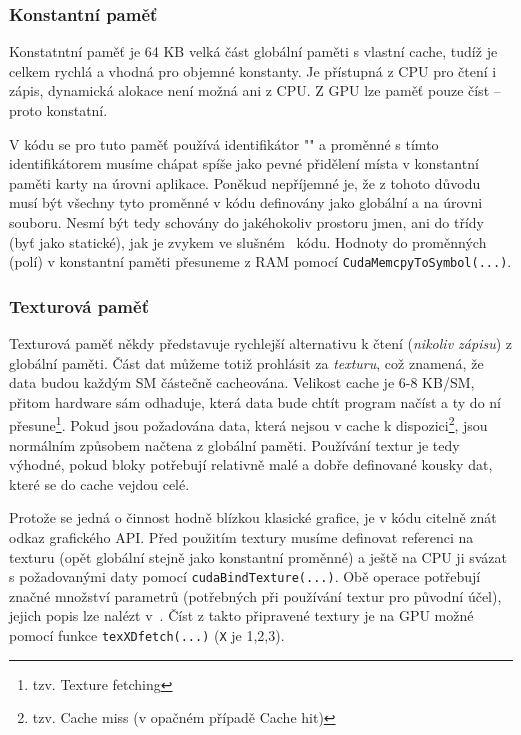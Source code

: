     \subsubsection{Konstantní paměť}

    Konstatntní paměť je 64 KB velká část globální paměti s vlastní cache, tudíž je celkem rychlá a vhodná pro objemné konstanty. Je přístupná z CPU pro čtení i zápis, dynamická alokace není možná ani z CPU. Z GPU lze paměť pouze číst -- proto konstatní.

    V kódu se pro tuto paměť používá identifikátor \Vr"" a proměnné s tímto identifikátorem musíme chápat spíše jako pevné přidělení místa v konstantní paměti karty na úrovni aplikace. Poněkud nepříjemné je, že z tohoto důvodu musí být všechny tyto proměnné v kódu definovány jako globální a na úrovni souboru. Nesmí být tedy schovány do jakéhokoliv prostoru jmen, ani do třídy (byť jako statické), jak je zvykem ve slušném \Cpp ~kódu. Hodnoty do proměnných (polí) v konstantní paměti přesuneme z RAM pomocí {\tt CudaMemcpyToSymbol(...)}.

    \subsubsection{Texturová paměť}

    Texturová paměť někdy představuje rychlejší alternativu k čtení (\emph{nikoliv zápisu}) z globální paměti. Část dat můžeme totiž prohlásit za \emph{texturu}, což znamená, že data budou každým SM částečně cacheována. Velikost cache je 6-8 KB/SM, přitom hardware sám odhaduje, která data bude chtít program načíst a ty do ní přesune\footnote{tzv. Texture fetching}. Pokud jsou požadována data, která nejsou v cache k dispozici\footnote{tzv. Cache miss (v opačném případě Cache hit)}, jsou normálním způsobem načtena z globální paměti. Používání textur je tedy výhodné, pokud bloky potřebují relativně malé a dobře definované kousky dat, které se do cache vejdou celé.

    Protože se jedná o činnost hodně blízkou klasické grafice, je v kódu citelně znát odkaz grafického API. Před použitím textury musíme definovat referenci na texturu (opět globální stejně jako konstantní proměnné) a ještě na CPU ji svázat s požadovanými daty pomocí {\tt cudaBindTexture(...)}. Obě operace potřebují značné množství parametrů (potřebných při používání textur pro původní účel), jejich popis lze nalézt v~\cite{CUDA programming g.}. Číst z takto připravené textury je na GPU možné pomocí funkce {\tt texXDfetch(...)} ({\tt X} je 1,2,3).

